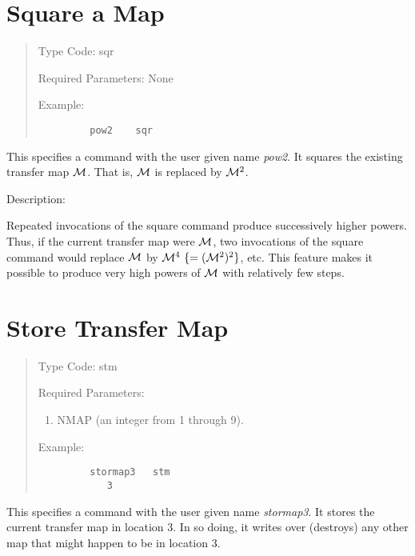 \newpage
\section{Square a Map}
\begin{quotation}
\noindent Type Code:  sqr
\vspace{5mm}

\noindent Required Parameters:  None

\vspace{5mm}
\noindent Example:
\begin{verbatim}
         pow2    sqr
\end{verbatim}
\end{quotation}
This specifies a command with the user given name {\em pow2}.  It squares the
existing transfer map ${\cal M}$.  That is, ${\cal M}$ is replaced by ${\cal M}^2$.

\vspace{5mm}
     Description:
\vspace{2mm}

     Repeated invocations of the square command produce successively
higher powers.  Thus, if the current transfer map were ${\cal M}$, two invocations
of the square command would replace ${\cal M}$ by ${\cal M}^4 \ \{=({\cal M}^2)^2\}$, etc.  This feature
makes it possible to produce very high powers of ${\cal M}$ with relatively few
steps.

\newpage
\section{Store Transfer Map}
\begin{quotation}
\noindent Type Code:  stm
\vspace{5mm}

\noindent Required Parameters:
\begin{enumerate}
      \item  NMAP (an integer from 1 through 9).
\end{enumerate}

\vspace{5mm}
\noindent Example:
\begin{verbatim}
         stormap3   stm
            3
\end{verbatim}
\end{quotation}
This specifies a command with the user given name {\em stormap3}.  It
stores the current transfer map in location 3.  In so doing, it writes
over (destroys) any other map that might happen to be in location 3.

